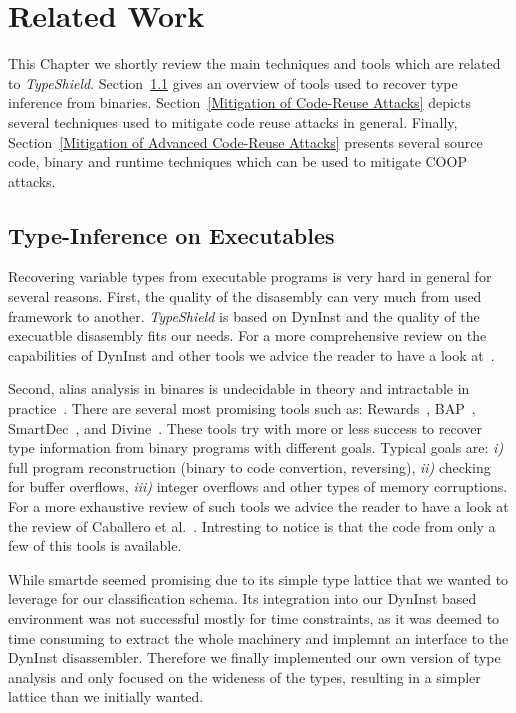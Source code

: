 \chapter{Related Work}
\label{chapter:Related_Work}
This Chapter we shortly review the main techniques and tools which are related 
to \textit{TypeShield}. 
Section~\ref{Type-Inference on Executables} gives an overview of tools used to
recover type inference from binaries.
Section~\ref{Mitigation of Code-Reuse Attacks} depicts several techniques
used to mitigate code reuse attacks in general.
Finally, Section~\ref{Mitigation of Advanced Code-Reuse Attacks} presents 
several source code, binary and runtime techniques which can be used to 
mitigate COOP attacks.

\section{Type-Inference on Executables}
\label{Type-Inference on Executables}
Recovering variable types from executable programs
is very hard in general for several reasons. 
First, the quality of the disasembly can very much from used
framework to another. \textit{TypeShield} is based on DynInst 
and the quality of the execuatble disasembly fits our needs. 
For a more comprehensive review on the capabilities of DynInst and other tools we
advice the reader to have a look at~\cite{andriesse:indepth}.

Second, alias analysis in binares is undecidable in theory and intractable in practice~\cite{alan:mycroft}.
There are several most promising tools such as: Rewards~\cite{lin:rewards}, BAP~\cite{bap:brumley}, 
SmartDec~\cite{fokin:smartdec}, and Divine~\cite{divine:balakrishnan}.
These tools try with more or less success to recover 
type information from binary programs with different goals.
Typical goals are: 
\textit{i)} full program reconstruction (binary to code convertion, reversing), 
\textit{ii)} checking for buffer overflows, 
\textit{iii)} integer overflows and other types of memory corruptions.
For a more exhaustive review of such tools we advice the reader to
have a look at the review of Caballero et al.~\cite{caballero:inference}.
Intresting to notice is that the code from only a few of this tools is available.

While smartde seemed promising due to its simple type lattice that we wanted to leverage for our classification schema. Its integration into our DynInst based environment was not successful mostly for time constraints, as it was deemed to time consuming to extract the whole machinery and implemnt an interface to the DynInst disassembler.
Therefore we finally implemented our own version of type analysis and only focused on the wideness of the types, resulting in a simpler lattice than we initially wanted.

